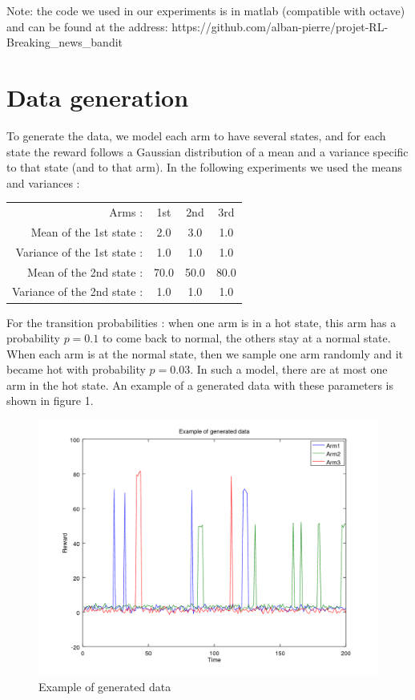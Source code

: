 \documentclass{article} %
\begin{document}
Note: the code we used in our experiments is in matlab (compatible with octave) and can be found at the address: https://github.com/alban-pierre/projet-RL-Breaking\_news\_bandit


\section{Data generation}

To generate the data, we model each arm to have several states, and for each state the reward follows a Gaussian distribution of a mean and a variance specific to that state (and to that arm). In the following experiments we used the means and variances :
\begin{center}
\begin{tabular}{rccc}
	Arms : & 1st & 2nd & 3rd \\
	Mean of the 1st state : & 2.0 & 3.0 & 1.0 \\
	Variance of the 1st state : & 1.0 & 1.0 & 1.0 \\
	Mean of the 2nd state : & 70.0 & 50.0 & 80.0 \\
	Variance of the 2nd state : & 1.0 & 1.0 & 1.0 \\
\end{tabular}
\end{center}
For the transition probabilities : when one arm is in a hot state, this arm has a probability $p=0.1$ to come back to normal, the others stay at a normal state. When each arm is at the normal state, then we sample one arm randomly and it became hot with probability $p=0.03$. In such a model, there are at most one arm in the hot state. An example of a generated data with these parameters is shown in figure 1.
\newline

\begin{figure}[h]
	\begin{center}
		\includegraphics[width=0.7\linewidth]{generated_data_one.png}
	\end{center}
	\caption{Example of generated data}
\end{figure}
\end{document}

